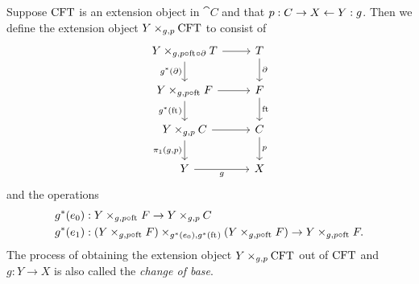 \begin{defn}\label{cobesys}
Suppose $\mathrm{CFT}$ is an extension object in $\cat{C}$ and that $p:C\rightarrow X\leftarrow Y:g$.
Then we define the extension object $\cobesys{Y}{\stesys}{g}{p}$ to consist of
\begin{equation*}
\begin{tikzcd}
\cobesys{Y}{\stesyst}{g}{p\circ\eft\circ\ebd}
  \ar{r}
  \ar{d}[swap]{g^\ast(\ebd)}
  &
\stesyst
  \ar{d}{\ebd}
  \\
\cobesys{Y}{\stesysf}{g}{p\circ\eft}
  \ar{r}
  \ar{d}[swap]{g^\ast(\eft)}
  &
\stesysf
  \ar{d}{\eft}
  \\
\cobesys{Y}{\stesysc}{g}{p}
  \ar{r}
  \ar{d}[swap]{\pullbackpr{1}{g}{p}}
  &
\stesysc
  \ar{d}{p}
  \\
Y \ar{r}[swap]{g}
  &
X
\end{tikzcd}
\end{equation*} 
and the operations
\begin{align*}
g^\ast(\ectxext) & : \pullback{Y}{\stesysf}{g}{p\circ\eft}\to \pullback{Y}{\stesysc}{g}{p}\\
g^\ast(\efamext) & : 
  \pullback{%
    \pullback{Y}{\stesysf}{g}{p\circ\eft}}{%
    \pullback{Y}{\stesysf}{g}{p\circ\eft}}{%
    g^\ast(\ectxext)}{%
    g^\ast(\eft)}
  \to 
  \pullback{Y}{\stesysf}{g}{p\circ\eft}.
\end{align*}
The process of obtaining the extension object $\cobesys{Y}{\stesys}{g}{p}$ out of $\mathrm{CFT}$
and $g:Y\to X$ is also called the \emph{change of base}.
\end{defn}

